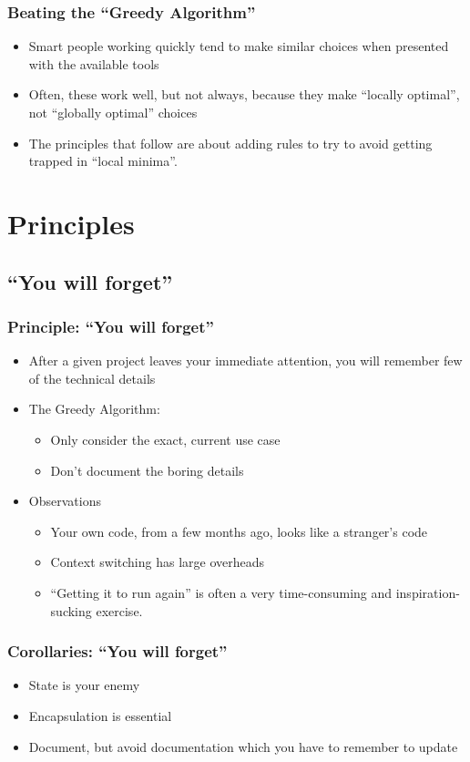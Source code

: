 \documentclass{beamer}
\begin{document}
\begin{frame}[fragile]
\frametitle{Beating the ``Greedy Algorithm''}
\begin{itemize}
  \item Smart people working quickly tend to make similar choices when presented with the available tools
\item Often, these work well, but not always, because they make ``locally optimal'', not ``globally optimal'' choices
\item The principles that follow are about adding rules to try to avoid getting trapped in ``local minima''.
\end{itemize}
\end{frame}

\section{Principles}

\subsection{``You will forget''}
\begin{frame}[fragile]
\frametitle{Principle: ``You will forget''}
\begin{itemize}
\item After a given project leaves your immediate attention, you will remember few of the technical details
\item The Greedy Algorithm:
\begin{itemize}
\item Only consider the exact, current use case
\item Don't document the boring details
\end{itemize}
\item Observations
\begin{itemize}
\item Your own code, from a few months ago, looks like a stranger's code
\item Context switching has large overheads
\item ``Getting it to run again'' is often a very time-consuming and inspiration-sucking exercise.
\end{itemize}
\end{itemize}
\end{frame}

\begin{frame}[fragile]
\frametitle{Corollaries: ``You will forget''}
  \begin{itemize}
    \item State is your enemy
    \item Encapsulation is essential
    \item Document, but avoid documentation which you have to remember to update
  \end{itemize}
\end{frame}
\end{document}
